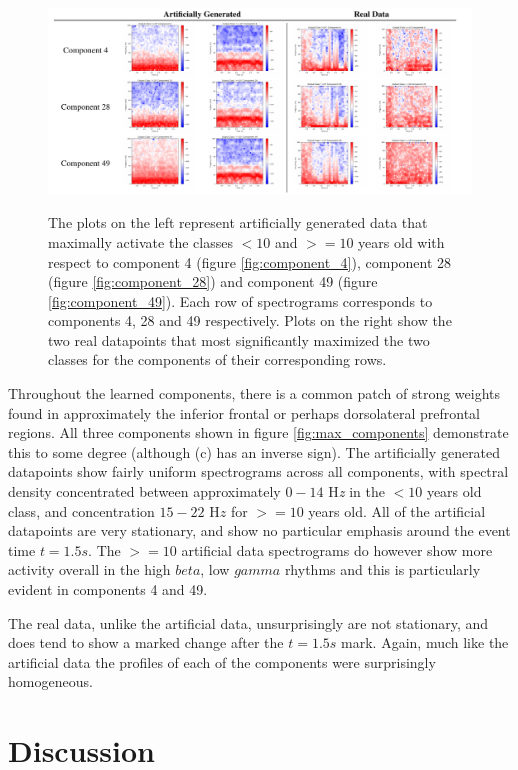 \documentclass[fleqn,10pt]{wlscirep}
\begin{document}
\begin{figure}[t]
  \caption{The plots on the left represent artificially generated data that maximally activate the classes $<10$ and $>=10$ years old with respect to component 4 (figure \ref{fig:component_4}), component 28 (figure \ref{fig:component_28}) and component 49 (figure \ref{fig:component_49}). Each row of spectrograms corresponds to components 4, 28 and 49 respectively. Plots on the right show the two real datapoints that most significantly maximized the two classes for the components of their corresponding rows.}
  \centering\includegraphics[width=\linewidth]{spectrogram_tables.png}
 \label{tab:max_spectrograms}
\end{figure}

Throughout the learned components, there is a common patch of strong weights found in approximately the inferior frontal or perhaps dorsolateral prefrontal regions. All three components shown in figure \ref{fig:max_components} demonstrate this to some degree (although (c) has an inverse sign). The artificially generated datapoints show fairly uniform spectrograms across all components, with spectral density concentrated between approximately $0-14$ H{\em z} in the $<10$ years old class, and concentration $15-22$ H$z$ for $>=10$ years old. All of the artificial datapoints are very stationary, and show no particular emphasis around the event time $t=1.5s$. The $>=10$ artificial data spectrograms do however show more activity overall in the high $beta$, low $gamma$ rhythms and this is particularly evident in components 4 and 49.

The real data, unlike the artificial data, unsurprisingly are not stationary, and does tend to show a marked change after the $t=1.5s$ mark. Again, much like the artificial data the profiles of each of the components were surprisingly homogeneous.

\section*{Discussion}
\end{document}

